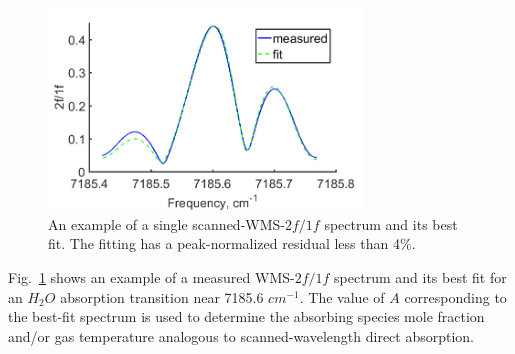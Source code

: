 \vspace{15mm}
 \begin{figure}[h]
    \centering
        \includegraphics[width=0.75\textwidth]{fig/ch3_fig7.png}
        \caption{An example of a single scanned-WMS-$2f/1f$ spectrum and its best fit. The fitting has a peak-normalized residual less than 4$\%$.}
    \label{fig:ch3_5}
\end{figure}

\vspace{20mm}
Fig.\ \ref{fig:ch3_5} shows an example of a measured WMS-$2f/1f$ spectrum and its best fit for an $H_2O$ absorption transition near 7185.6 $cm^{-1}$. The value of $A$ corresponding to the best-fit spectrum is used to determine the absorbing species mole fraction and/or gas temperature analogous to scanned-wavelength direct absorption.



